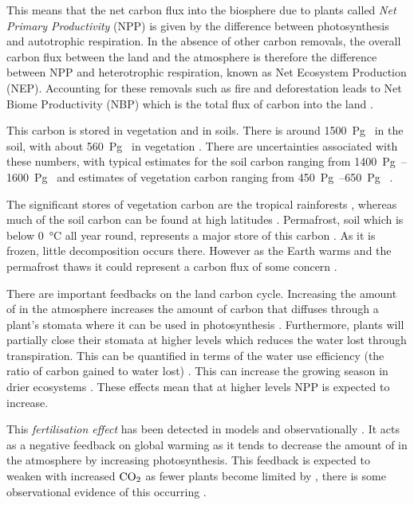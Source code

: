 This means that the net carbon flux into the biosphere due to plants called \emph{Net Primary Productivity} (NPP) is given by the difference between photosynthesis and
autotrophic respiration. In the absence of other carbon removals, the overall carbon flux between the land and the atmosphere is therefore the
difference between NPP and heterotrophic respiration, known as Net Ecosystem Production (NEP). Accounting for these removals such as fire and deforestation leads to
Net Biome Productivity (NBP) which is the total flux of carbon into the land \parencite{Lovett2006,Fernandez-Martinez2023}. 

This carbon is stored in vegetation and in soils. There is around \SI{1500}{\peta\gram\carbon} in the soil, with about \SI{560}{\peta\gram\carbon} in vegetation \parencite{Crowther2019}.
There are uncertainties associated with these numbers, with typical estimates for the soil carbon ranging from \SIrange{1400}{1600}{\peta\gram\carbon} \parencite{Batjes2016} and
estimates of vegetation carbon ranging from \SIrange{450}{650}{\peta\gram\carbon} \parencite{Ciais2013}.

The significant stores of vegetation carbon are the tropical rainforests \parencite{Malhi2006}, whereas much of the soil carbon can be found at high latitudes \parencite{Varney2020}.
Permafrost, soil which is below \SI{0}{\degreeCelsius} all year round, represents a major store of this carbon \parencite{Hugelius2014}. As it is frozen, little decomposition occurs there.
However as the Earth warms and the permafrost thaws it could represent a carbon flux of some concern \parencite{Schuur2015}.


There are important feedbacks on the land carbon cycle.
Increasing the amount of  in the atmosphere increases the amount of carbon that diffuses through a plant's stomata where it can be used in photosynthesis \parencite{Farquhar1980}.
Furthermore, plants will partially close their stomata at higher  levels \parencite{DeKauwe2013} which reduces the water lost through transpiration. This can be quantified in terms of the
water use efficiency (the ratio of carbon gained to water lost) \parencite{Drake1997}. This can increase the growing season in drier ecosystems \parencite{Frank2015}.
These effects mean that at higher  levels NPP is expected to increase.

This \emph{ fertilisation effect} has been detected in models \parencite{Friedlingstein2006,Arora2020,Wenzel2016} and observationally \parencite{Ainsworth2007,KolbySmith2016}.
It acts as a negative feedback on global warming as it tends to decrease the amount of  in the atmosphere by increasing photosynthesis. This feedback is
expected to weaken with increased $\ce{CO2}$ as fewer plants become limited by , there is some observational evidence of this occurring \parencite{Wang2020}.

